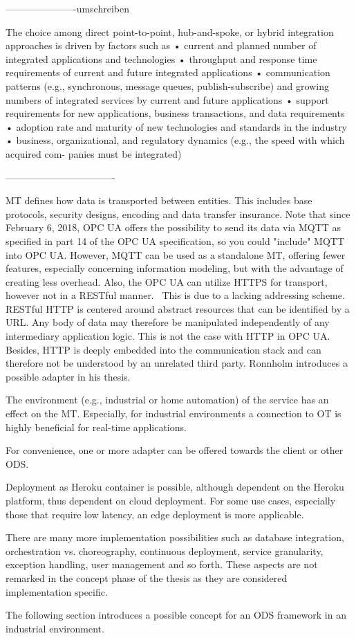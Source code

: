 ----------------------umschreiben

The choice among direct point-to-point, hub-and-spoke, or hybrid integration approaches is driven 
by factors such as 
• current and planned number of integrated applications and technologies 
• throughput and response time requirements of current and future integrated applications 
• communication patterns (e.g., synchronous, message queues, publish-subscribe) and growing 
numbers of integrated services by current and future applications 
• support requirements for new applications, business transactions, and data requirements 
• adoption rate and maturity of new technologies and standards in the industry 
• business, organizational, and regulatory dynamics (e.g., the speed with which acquired com-
panies must be integrated)~\cite{Bianco2007EvaluatingArchitecture}

----------------------------------

MT defines how data is transported between entities. This includes base protocols, security designs, encoding and data transfer insurance. Note that since February 6, 2018, OPC UA offers the possibility to send its data via MQTT as specified in part 14 of the OPC UA specification, so you could "include" MQTT into OPC UA. However, MQTT can be used as a standalone MT, offering fewer features, especially concerning information modeling, but with the advantage of creating less overhead. Also, the OPC UA can utilize HTTPS for transport, however not in a RESTful manner.~\cite{Ronnholm2018IntegrationTranslator} This is due to a lacking addressing scheme. RESTful HTTP is centered around abstract resources that can be identified by a URL. Any body of data may therefore be manipulated independently of any intermediary application logic. This is not the case with HTTP in OPC UA. Besides, HTTP is deeply embedded into the communication stack and can therefore not be understood by an unrelated third party. Ronnholm introduces a possible adapter in his thesis.~\cite{Ronnholm2018IntegrationTranslator}

The environment (e.g., industrial or home automation) of the service has an effect on the MT. Especially, for industrial environments a connection to OT is highly beneficial for real-time applications. 

For convenience, one or more adapter can be offered towards the client or other ODS. 

Deployment as Heroku container is possible, although dependent on the Heroku platform, thus dependent on cloud deployment. For some use cases, especially those that require low latency, an edge deployment is more applicable. 

There are many more implementation possibilities such as database integration, orchestration vs. choreography, continuous deployment, service granularity, exception handling, user management and so forth. These aspects are not remarked in the concept phase of the thesis as they are considered implementation specific.

The following section introduces a possible concept for an ODS framework in an industrial environment.
